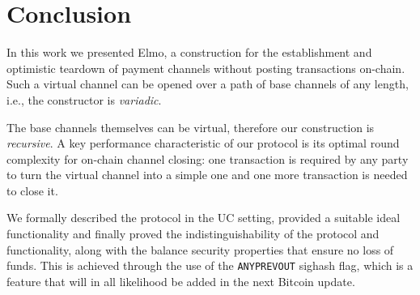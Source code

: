 \section{Conclusion}

  In this work we presented Elmo, a
  construction for the establishment and optimistic teardown of
  payment channels without posting transactions on-chain.
  Such a virtual channel can be opened over a path of base channels of
  any length, i.e., the constructor is \emph{variadic}.

  The base channels themselves can be virtual, therefore our construction is
  \emph{recursive}. A key performance characteristic of our
  protocol is its optimal round complexity for on-chain channel
  closing: one transaction is required by any party to turn the
  virtual channel into a simple one and one more transaction is needed to close
  it.

  We formally described the protocol in the UC setting, provided a suitable
  ideal functionality and finally proved the indistinguishability
  of the protocol and functionality, along with the balance security properties
  that ensure no loss of funds. This is
  achieved through the use of the \texttt{ANYPREVOUT} sighash flag, which is a
  feature that will in all likelihood be added in the next Bitcoin update.
